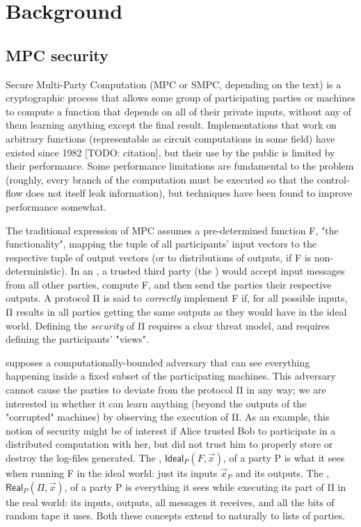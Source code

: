 \documentclass[conference]{IEEEtran}
\begin{document}
\section{Background}

\subsection{MPC security}

Secure Multi-Party Computation (MPC or SMPC, depending on the text)
is a cryptographic process that allows some group of participating parties or machines
to compute a function that depends on all of their private inputs,
without any of them learning anything except the final result.
Implementations that work on arbitrary functions (representable as circuit computations in some field)
have existed since 1982 [TODO: citation], %
but their use by the public is limited by their performance.
Some performance limitations are fundamental to the problem
(roughly, every branch of the computation must be executed so that the control-flow does not itself leak information),
but techniques have been found to improve performance somewhat.

The traditional expression of MPC assumes a pre-determined function F, "the functionality",
mapping the tuple of all participants' input vectors to the respective tuple of output vectors
(or to distributions of outputs, if F is non-deterministic).
In an , a trusted third party (the ) would accept input messages
from all other parties, compute F, and then send the parties their respective outputs.
A  protocol Π is said to \textit{correctly} implement F if, for all possible inputs,
Π results in all parties getting the same outputs as they would have in the ideal world.
Defining the \textit{security} of Π requires a clear threat model, and requires defining the participants' "views".

 supposes a computationally-bounded adversary
that can see everything happening inside a fixed subset of the participating machines.
This adversary cannot cause the parties to deviate from the protocol Π in any way;
we are interested in whether it can learn anything (beyond the outputs of the "corrupted" machines)
by observing the execution of Π.
As an example, this notion of security might be of interest if Alice trusted Bob to participate
in a distributed computation with her, but did not trust him to properly store or destroy the log-files
generated.
The , $\mathsf{Ideal}_P(F,\vec{x})$, of a party P is what it sees when running F in the ideal world:
just its inputs $\vec{x}_P$ and its outputs.
The , $\mathsf{Real}_P(Π, \vec{x})$, of a party P is everything it sees while executing its part of Π in the real world:
its inputs, outputs, all messages it receives, and all the bits of random tape it uses.
Both these concepts extend to naturally to lists of parties.
\end{document}
